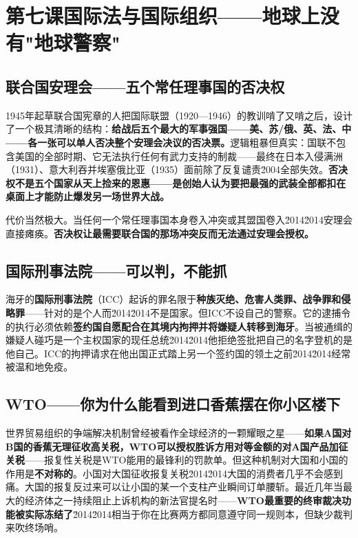 \documentclass[a4paper,12pt]{ctexart}
\begin{document}
\newpage
\section{\textcolor{orange!80!black}{第七课\quad 国际法与国际组织——地球上没有"地球警察"}}

\subsection*{联合国安理会——五个常任理事国的否决权}

1945年起草联合国宪章的人把国际联盟（1920—1946）的教训啃了又啃之后，设计了一个极其清晰的结构：\textbf{给战后五个最大的军事强国——美、苏\slash 俄、英、法、中——各一张可以单人否决整个安理会决议的否决票。}逻辑粗暴但真实：国联不包含美国的全部时期、它无法执行任何有武力支持的制裁——最终在日本入侵满洲（1931）、意大利吞并埃塞俄比亚（1935）面前除了反复谴责\u2004全部失效。\textbf{否决权不是五个国家从天上捡来的恩惠——是创始人认为要把最强的武装全部都扣在桌面上才能防止爆发另一场世界大战。}

代价当然极大。当任何一个常任理事国本身卷入冲突或其盟国卷入\u2014\u2014安理会直接瘫痪。\textbf{否决权让最需要联合国的那场冲突反而无法通过安理会授权。}

\subsection*{国际刑事法院——可以判，不能抓}

海牙的\textbf{国际刑事法院}（ICC）起诉的罪名限于\textbf{种族灭绝、危害人类罪、战争罪和侵略罪}——针对的是个人而\u2014\u2014不是国家。但ICC不设自己的警察。它的逮捕令的执行必须依赖\textbf{签约国自愿配合在其境内拘押并将嫌疑人转移到海牙}。当被通缉的嫌疑人碰巧是一个主权国家的现任总统\u2014\u2014他拒绝签批把自己的名字登机的是他自己。ICC的拘押请求在他出国正式踏上另一个签约国的领土之前\u2014\u2014经常被温和地免疫。

\subsection*{WTO——你为什么能看到进口香蕉摆在你小区楼下}

世界贸易组织的争端解决机制曾经被看作全球经济的一颗耀眼之星——\textbf{如果A国对B国的香蕉无理征收高关税，WTO可以授权胜诉方用对等金额的对A国产品加征关税}——报复性关税是WTO能用的最锋利的罚款单。但这种机制对大国和小国的作用是\textbf{不对称的}。小国对大国征收报复关税\u2014\u2014大国的消费者几乎不会感到痛。大国的报复反过来可以让小国的某一个支柱产业瞬间订单腰斩。最近几年当最大的经济体之一持续阻止上诉机构的新法官提名时——\textbf{WTO最重要的终审裁决功能被实际冻结了}\u2014\u2014相当于你在比赛两方都同意遵守同一规则本，但缺少裁判来吹终场哨。
\end{document}
